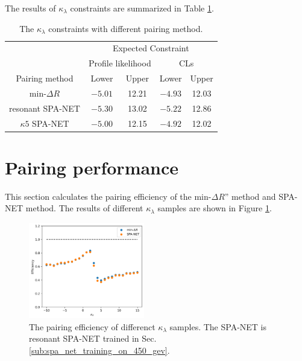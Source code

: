 \documentclass[12pt]{article}
\begin{document}
		The results of $\kappa_\lambda$ constraints are summarized in Table \ref{tab:kappa_constraint}.
		\begin{table}[htpb]
			\centering
			\caption{The $\kappa_\lambda$ constraints with different pairing method.}
			\label{tab:kappa_constraint}
			\begin{tabular}{c|cc|cc}
								  & \multicolumn{4}{c}{Expected Constraint}                          \\
								  & \multicolumn{2}{c}{Profile likelihood} & \multicolumn{2}{c}{CLs} \\ \hline
			Pairing method        & Lower              & Upper             & Lower      & Upper      \\ \hline
			$\text{min-}\Delta R$ & $-5.01$            & 12.21             & $-4.93$      & 12.03      \\
			resonant SPA-NET      & $-5.30$            & 13.02             & $-5.22$     & 12.86      \\
			$\kappa 5$ SPA-NET    & $-5.00$            & 12.15             & $-4.92$      & 12.02          
			\end{tabular}
		\end{table}


\section{Pairing performance}%
\label{sec:pairing_performance}
	This section calculates the pairing efficiency of the $\text{min-}\Delta R$'' method and SPA-NET method. The results of different $\kappa_\lambda$ samples are shown in Figure \ref{fig:pairing_efficiency_kappa}.
	\begin{figure}[htpb]
		\centering
		\includegraphics[width=0.45\textwidth]{pairing_efficiency_kappa.png}
		\caption{The pairing efficiency of differenct $\kappa_\lambda $ samples. The SPA-NET is resonant SPA-NET trained in Sec. \ref{sub:spa_net_training_on_450_gev}.}
		\label{fig:pairing_efficiency_kappa}
	\end{figure}
\end{document}

